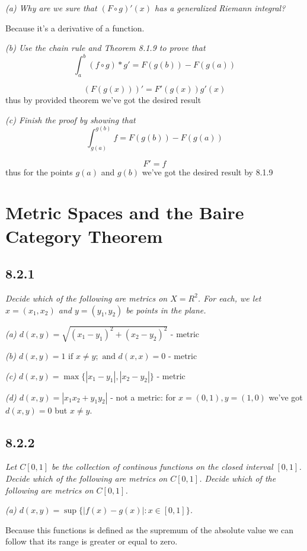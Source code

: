 \documentclass[11pt,oneside,titlepage]{book}
\begin{document}
\textit{(a) Why are we sure that $(F \circ g)'(x)$ has a generalized Riemann integral?}

Because it's a derivative of a function.

\textit{(b) Use the chain rule and Theorem 8.1.9 to prove that }
$$\int_a^b (f \circ g) * g' = F(g(b)) - F(g(a))$$

$$(F(g(x)))' = F'(g(x)) g'(x)$$
thus by provided theorem we've got the desired result


\textit{(c) Finish the proof by showing that }
$$\int_{g(a)}^{g(b)}f = F(g(b)) - F(g(a))$$

$$F' = f$$
thus for the points $g(a)$ and $g(b)$ we've got the desired result by 8.1.9

\section{Metric Spaces and the Baire Category Theorem}

\subsection*{8.2.1}
\textit{Decide which of the following are metrics on $X = R^2$. For each, we let $x = (x_1, x_2)$
  and $y = (y_1, y_2)$ be points in the plane.}

\textit{(a) $d(x, y) = \sqrt{(x_1 - y_1)^2 + (x_2 - y_2)^2}$} - metric

\textit{(b) $d(x, y) = 1 \text{ if } x \neq y; \text{ and } d(x, x) = 0$} - metric

\textit{(c) $d(x, y) = \max\{|x_1 - y_1|, |x_2 - y_2|\}$} - metric

\textit{(d) $d(x, y) = |x_1 x_2 + y_1 y_2|$} - not a metric: for $x = (0, 1), y = (1, 0)$ we've
got $d(x, y) = 0$ but $x \neq y$.

\subsection*{8.2.2}
\textit{Let $C[0, 1]$ be the collection of continous functions on the closed interval $[0, 1]$.
  Decide which of the following are metrics on $C[0, 1]$. Decide which of the following are
  metrics on $C[0, 1]$.}

\textit{(a) $d(x, y) = \sup\{|f(x) - g(x)|: x \in [0, 1]\}$.}

Because this functions is defined as the supremum of the absolute value we can follow that
its range is greater or equal to zero.
\end{document}
